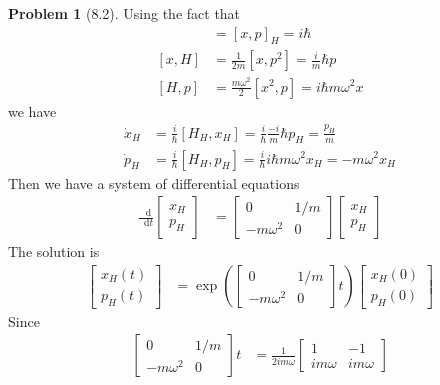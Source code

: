 \documentclass[twoside,11pt]{article}
\renewcommand*\d{\mathop{}\!\mathrm{d}}
\theoremstyle{definition}
\newtheorem{problem}{Problem}
\theoremstyle{remark}
\begin{document}
\begin{problem}[8.2]
Using the fact that
\begin{align*}
    [x_H, p_H] &= [x, p]_H = i\hbar\\
    [x, H] &= \frac{1}{2m}[x, p^2] = \frac{i}{m}\hbar p\\
    [H, p] &= \frac{m\omega^2}{2}[x^2, p] = i\hbar m\omega^2 x
\end{align*}
we have
\begin{align*}
    \dot{x}_H &= \frac{i}{\hbar}[H_H, x_H]
    = \frac{i}{\hbar}\frac{-i}{m}\hbar p_H = \frac{p_H}{m}\\
    \dot{p}_H &= \frac{i}{\hbar}[H_H, p_H] 
    = \frac{i}{\hbar}i\hbar m\omega^2 x_H = -m\omega^2 x_H
\end{align*}
Then we have a system of differential equations
\begin{align*}
    \frac{\d }{\d t}\begin{bmatrix}
        x_H\\ p_H
    \end{bmatrix}
    &=\begin{bmatrix}
        0 & 1/m\\
        -m\omega^2 & 0
    \end{bmatrix}
    \begin{bmatrix}
        x_H\\ p_H
    \end{bmatrix}
\end{align*}
The solution is
\begin{align*}
    \begin{bmatrix}
        x_H(t)\\ p_H(t)
    \end{bmatrix}
    &= 
    \exp\left(
    \begin{bmatrix}
        0 & 1/m\\
        -m\omega^2 & 0
    \end{bmatrix}t
    \right)
    \begin{bmatrix}
        x_H(0)\\ p_H(0)
    \end{bmatrix}
\end{align*}
Since
\begin{align*}
    \begin{bmatrix}
        0 & 1/m\\
        -m\omega^2 & 0
    \end{bmatrix}t &=
    \frac{1}{2im\omega}
    \begin{bmatrix}
        1 & -1 \\ im\omega & im\omega

\end{bmatrix}
\end{align*}
\end{problem}
\end{document}
